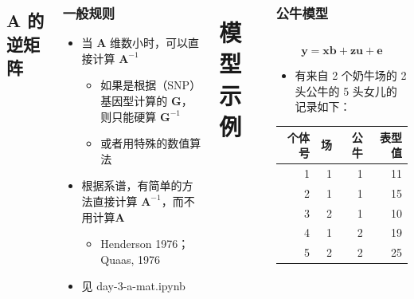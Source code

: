 \documentclass[serif,aspectratio=169]{beamer}
\begin{document}
\begin{frame}
\begin{columns}
\subsection{A 的逆矩阵}
\begin{frame}
  \frametitle{一般规则}
  \begin{itemize}
  \item 当 $\mathbf{A}$ 维数小时，可以直接计算 $\mathbf{A}^{-1}$
    \begin{itemize}
    \item 如果是根据（SNP）基因型计算的 $\mathbf{G}$，则只能硬算 $\mathbf{G}^{-1}$
    \item 或者用特殊的数值算法
    \end{itemize}
  \item 根据系谱，有简单的方法直接计算 $\mathbf{A}^{-1}$，而不用计算$\mathbf{A}$
    \begin{itemize}
    \item Henderson 1976；Quaas, 1976
    \end{itemize}
  \item 见 {\color{cyan}day-3-a-mat.ipynb}
  \end{itemize}
\end{frame}


\section{模型示例}
\begin{frame}
  \frametitle{公牛模型}
  \begin{columns}
    \begin{column}{.4\textwidth}
      $$\mathbf{y=xb+zu+e}$$
      \begin{itemize}
      \item 有来自 2 个奶牛场的 2 头公牛的 5 头女儿的记录如下：
      \end{itemize}
      \centering
      \begin{tabular}{rrrr}
        个体号 & 场 & 公牛 & 表型值\\\hline
        1 & 1 & 1 & 11\\
        2 & 1 & 1 & 15\\
        3 & 2 & 1 & 10\\
        4 & 1 & 2 & 19\\
        5 & 2 & 2 & 25
      \end{tabular}
    \end{column}
    

\end{columns}
\end{frame}
\end{columns}
\end{frame}
\end{document}
